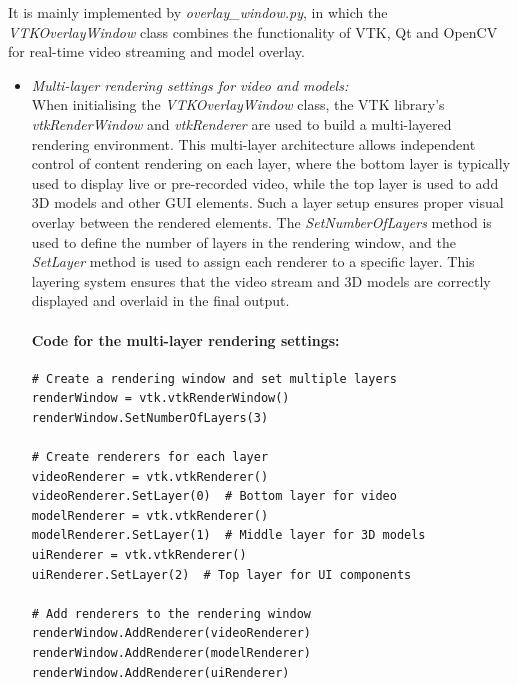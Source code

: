 \documentclass[12pt]{article}
\begin{document}
\begin{enumerate}
\begin{enumerate}
                        It is mainly implemented by \emph{overlay\_window.py}, in which the \emph{VTKOverlayWindow} class combines the functionality of VTK, Qt and OpenCV for real-time video streaming and model overlay.
                        \begin{itemize}
                              \item \textit{Multi-layer rendering settings for video and models:}
                                    \\
                                    When initialising the \emph{VTKOverlayWindow} class, the VTK library's \emph{vtkRenderWindow} and \emph{vtkRenderer} are used to build a multi-layered rendering environment\cite{7783818}. This multi-layer architecture allows independent control of content rendering on each layer, where the bottom layer is typically used to display live or pre-recorded video, while the top layer is used to add 3D models and other GUI elements\cite{5974642,6194820}. Such a layer setup ensures proper visual overlay between the rendered elements. The \emph{SetNumberOfLayers} method is used to define the number of layers in the rendering window, and the \emph{SetLayer} method is used to assign each renderer to a specific layer. This layering system ensures that the video stream and 3D models are correctly displayed and overlaid in the final output\cite{7783818}.
                                    \paragraph{Code for the multi-layer rendering settings:}
                                    \begin{verbatim}
# Create a rendering window and set multiple layers
renderWindow = vtk.vtkRenderWindow()
renderWindow.SetNumberOfLayers(3)

# Create renderers for each layer
videoRenderer = vtk.vtkRenderer()
videoRenderer.SetLayer(0)  # Bottom layer for video
modelRenderer = vtk.vtkRenderer()
modelRenderer.SetLayer(1)  # Middle layer for 3D models
uiRenderer = vtk.vtkRenderer()
uiRenderer.SetLayer(2)  # Top layer for UI components

# Add renderers to the rendering window
renderWindow.AddRenderer(videoRenderer)
renderWindow.AddRenderer(modelRenderer)
renderWindow.AddRenderer(uiRenderer)
                              \end{verbatim}
                             

\end{itemize}
\end{enumerate}
\end{enumerate}
\end{document}
